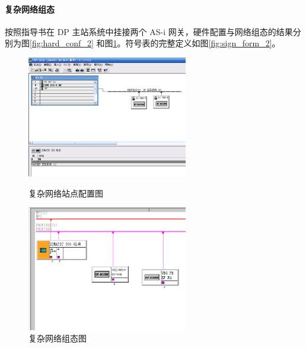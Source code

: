 \paragraph{复杂网络组态}
按照指导书在 {\ttfamily DP} 主站系统中挂接两个 {\ttfamily AS-i} 网关，硬件配置与网络组态的结果分别为图\ref{fig:hard_conf_2} 和图\ref{fig:net_org_2}。符号表的完整定义如图\ref{fig:sign_form_2}。

\begin{figure}[htbp]
\begin{minipage}{0.5\textwidth}
\centering
\includegraphics[width=7cm]{resource/hard_config_2.png}
\caption{复杂网络站点配置图}
\label{fig:hard_conf_2}
\end{minipage}
\hfill
\begin{minipage}{0.5\textwidth}
\centering
\includegraphics[width=7cm]{resource/net_organize_2.png}
\caption{复杂网络组态图}
\label{fig:net_org_2}
\end{minipage}
\end{figure}

